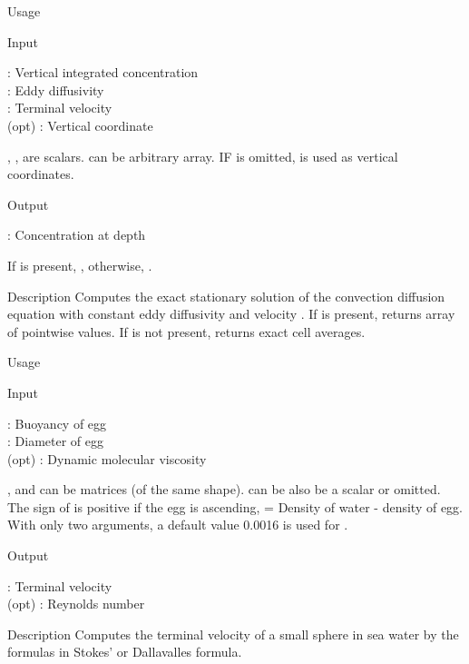{

\begin{tdesc}
\item[Usage] 
\item[Input]
  \begin{vartab}
     \> : \> Vertical integrated concentration \>  [eggs/m$^2$] \\
     \> : \> Eddy diffusivity     \> [\sqmps] \\
     \> : \> Terminal velocity   \>  [\mps] \\
   (opt) \> : \> Vertical coordinate  \> [\m] 
  \end{vartab}
  , ,  are scalars.  can be arbitrary array.
  IF  is omitted,  is used as vertical coordinates.
\item[Output]
  \begin{vartab}
       \>  : \> Concentration at depth  \> [eggs/m$^3$]
  \end{vartab}
  If  is present, ,
  otherwise, .
\item[Description]
   Computes the exact stationary solution of the
   convection diffusion equation with constant
   eddy diffusivity  and velocity .
   If  is present, returns array of pointwise values.
   If  is not present, returns exact cell averages.
\end{tdesc}


\begin{tdesc}
\item[Usage] 
\item[Input]
   \begin{vartab}
     \> : \> Buoyancy of egg  \> [\kgpcum] \\
        \> : \> Diameter of egg  \> [\m] \\
    (opt) \> : 
         \> Dynamic molecular viscosity \>   [kgm$^{-1}$s$^{-1}$] 
   \end{vartab}
   ,  and  can be matrices (of the same shape).
    can be also be a scalar or omitted.
   The sign of  is positive if the egg is ascending,
    = Density of water - density of egg. With only two arguments,
   a default value 0.0016 is used for . 
\item[Output]
  \begin{vartab}
     \> : \> Terminal velocity  \> [\mps] \\
   (opt) \> : \> Reynolds number
  \end{vartab}
\item[Description]
  Computes the terminal velocity of a small sphere in sea water
  by the formulas in Stokes' or Dallavalles formula.
\end{tdesc}


}

